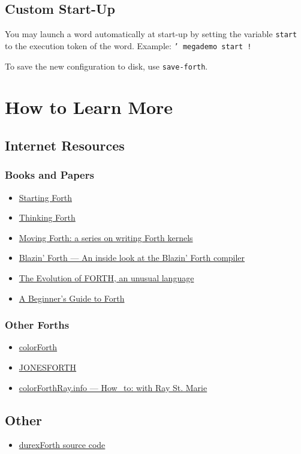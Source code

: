 \subsection{Custom Start-Up}

You may launch a word automatically at start-up by setting the variable \texttt{start} to the execution token of the word.  Example: \texttt{' megademo start !}

To save the new configuration to disk, use \texttt{save-forth}.

\section{How to Learn More}

\subsection{Internet Resources}

\subsubsection{Books and Papers}

\begin{itemize}
\item \href{http://www.forth.com/starting-forth/}{Starting Forth}
\item \href{http://thinking-forth.sourceforge.net/}{Thinking Forth}
\item \href{http://www.bradrodriguez.com/papers/}{Moving Forth: a series on writing Forth kernels}
\item \href{http://www.csbruce.com/~csbruce/cbm/transactor/v7/i5/p058.html}{Blazin' Forth --- An inside look at the Blazin' Forth compiler}
\item \href{http://www.drdobbs.com/architecture-and-design/the-evolution-of-forth-an-unusual-langua/228700557}{The Evolution of FORTH, an unusual language}
\item \href{http://galileo.phys.virginia.edu/classes/551.jvn.fall01/primer.htm}{A Beginner's Guide to Forth}
\end{itemize}

\subsubsection{Other Forths}

\begin{itemize}
\item \href{http://www.colorforth.com/cf.html}{colorForth}
\item \href{http://www.annexia.org/forth}{JONESFORTH}
\item \href{http://colorforthray.info/}{colorForthRay.info --- How\_to: with Ray St. Marie}
\end{itemize}

\subsection{Other}

\begin{itemize}
\item \href{http://code.google.com/p/durexforth/}{durexForth source code}
\end{itemize}

